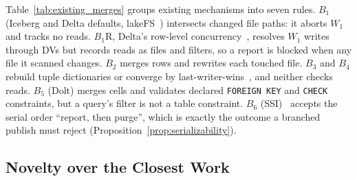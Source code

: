 \documentclass[sigconf, nonacm]{acmart}
\begin{document}
Table~\ref{tab:existing_merges} groups existing mechanisms into seven rules. $B_1$ (Iceberg and Delta defaults, lakeFS~\cite{lakefs}) intersects changed file paths: it aborts $W_1$ and tracks no reads. $B_1\text{R}$, Delta's row-level concurrency~\cite{delta2024rowlevel, deltaconcurrency}, resolves $W_1$ writes through DVs but records reads as files and filters, so a report is blocked when any file it scanned changes. $B_2$ merges rows and rewrites each touched file. $B_3$ and $B_4$ rebuild tuple dictionaries or converge by last-writer-wins~\cite{almeida2024crdt}, and neither checks reads. $B_5$ (Dolt) merges cells and validates declared \texttt{FOREIGN KEY} and \texttt{CHECK} constraints, but a query's filter is not a table constraint. $B_6$ (SSI)~\cite{adya1999weak, cahill2008serializable} accepts the serial order ``report, then purge'', which is exactly the outcome a branched publish must reject (Proposition~\ref{prop:serializability}).

\subsection{Novelty over the Closest Work}
\label{sec:bg_novelty}
\end{document}

